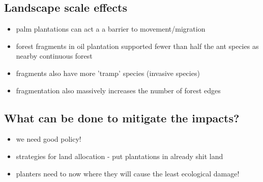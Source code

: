 \subsection*{Landscape scale effects}
\begin{itemize}
	\item palm plantations can act a a barrier to movement/migration
	\item forest fragments in oil plantation supported fewer than half the ant species as nearby continuous forest
	\item fragments also have more 'tramp' species (invasive species)
	\item fragmentation also massively increases the number of forest edges
\end{itemize}


\subsection*{What can be done to mitigate the impacts?}
\begin{itemize}
	\item we need good policy!
	\item strategies for land allocation - put plantations in already shit land
	\item planters need to now where they will cause the least ecological damage!
\end{itemize}